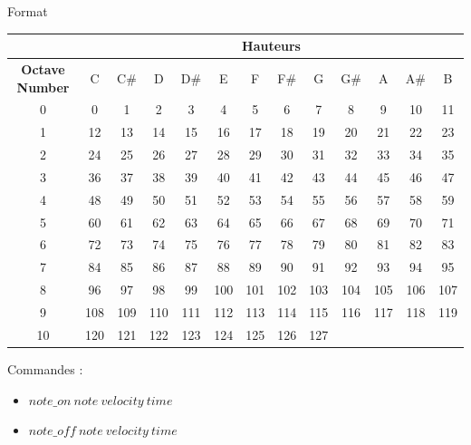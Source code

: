 \documentclass{beamer}
\begin{document}
\begin{frame}{Format}
\begin{tiny}
\begin{center}
\begin{tabular}{|c|c|c|c|c|c|c|c|c|c|c|c|c|}
\hline
 & \multicolumn{12}{c|}{\textbf{Hauteurs}} \\
\hline
\textbf{Octave Number} & C & C\# & D & D\# & E & F & F\# & G & G\# & A & A\# & B  \\
\hline
0 & 0 & 1 & 2 & 3 & 4 & 5 & 6 & 7 & 8 & 9 & 10 & 11  \\
\hline
1 & 12 & 13 & 14 & 15 & 16 & 17 & 18 & 19 & 20 & 21 & 22 & 23  \\
\hline
2 & 24 & 25 & 26 & 27 & 28 & 29 & 30 & 31 & 32 & 33 & 34 & 35  \\
\hline
3 & 36 & 37 & 38 & 39 & 40 & 41 & 42 & 43 & 44 & 45 & 46 & 47  \\
\hline
4 & 48 & 49 & 50 & 51 & 52 & 53 & 54 & 55 & 56 & 57 & 58 & 59  \\
\hline
5 & 60 & 61 & 62 & 63 & 64 & 65 & 66 & 67 & 68 & 69 & 70 & 71  \\
\hline
6 & 72 & 73 & 74 & 75 & 76 & 77 & 78 & 79 & 80 & 81 & 82 & 83  \\
\hline
7 & 84 & 85 & 86 & 87 & 88 & 89 & 90 & 91 & 92 & 93 & 94 & 95  \\
\hline
8 & 96 & 97 & 98 & 99 & 100 & 101 & 102 & 103 & 104 & 105 & 106 & 107  \\
\hline
9 & 108 & 109 & 110 & 111 & 112 & 113 & 114 & 115 & 116 & 117 & 118 & 119  \\
\hline
10 & 120 & 121 & 122 & 123 & 124 & 125 & 126 & 127 &   &   &   & \\
\hline
\end{tabular}
\end{center}
\end{tiny}
Commandes :
\begin{itemize}
\item $note\_on \ note \ velocity \ time$
\item $note\_off \ note \ velocity \ time$
\end{itemize}
\end{frame}
\end{document}
